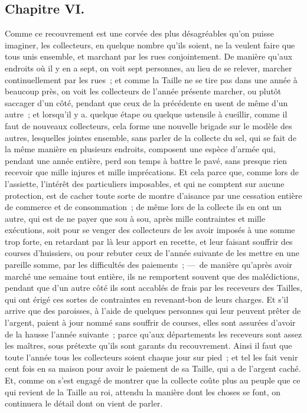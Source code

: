 \documentclass[french,twoside]{book} %
\begin{document}
\subsection[{Chapitre VI.}]{Chapitre VI.}
\noindent Comme ce recouvrement est une corvée des plus désagréables qu’on puisse imaginer, les collecteurs, en quelque nombre qu’ils soient, ne la veulent faire que tous unis ensemble, et marchant par les rues conjointement. De manière qu’aux endroits où il y en a sept, on voit sept personnes, au lieu de se relever, marcher continuellement par les rues ; et comme la Taille ne se tire pas dans une année à beaucoup près, on voit les collecteurs de l’année présente marcher, ou plutôt saccager d’un côté, pendant que ceux de la précédente en usent de même d’un autre ; et lorsqu’il y a. quelque étape ou quelque ustensile à cueillir, comme il faut de nouveaux collecteurs, cela forme une nouvelle brigade sur le modèle des autres, lesquelles jointes ensemble, sans parler de la collecte du sel, qui se fait de la même manière en plusieurs endroits, composent une espèce d’armée qui, pendant une année entière, perd son temps à battre le pavé, sans presque rien recevoir que mille injures et mille imprécations. Et cela parce que, comme lors de l’assiette, l’intérêt des particuliers imposables, et qui ne comptent sur aucune protection, est de cacher toute sorte de montre d’aisance par une cessation entière de commerce et de consommation ; de même lors de la collecte ils en ont un autre, qui est de ne payer que sou à sou, après mille contraintes et mille exécutions, soit pour se venger des collecteurs de les avoir imposés à une somme trop forte, en retardant par là leur apport en recette, et leur faisant souffrir des courses d’huissiers, ou pour rebuter ceux de l’année suivante de les mettre en une pareille somme, par les difficultés des paiements ; — de manière qu’après avoir marché une semaine tout entière, ils ne remportent souvent que des malédictions, pendant que d’un autre côté ils sont accablés de frais par les receveurs des Tailles, qui ont érigé ces sortes de contraintes en revenant-bon de leurs charges. Et s’il arrive que des paroisses, à l’aide de quelques personnes qui leur peuvent prêter de l’argent, paient à jour nommé sans souffrir de courses, elles sont assurées d’avoir de la hausse l’année suivante ; parce qu’aux départements les receveurs sont assez les maîtres, sous prétexte qu’ils sont garants du recouvrement. Ainsi il faut que toute l’année tous les collecteurs soient chaque jour sur pied ; et tel les fait venir cent fois en sa maison pour avoir le paiement de sa Taille, qui a de l’argent caché. Et, comme on s’est engagé de montrer que la collecte coûte plus au peuple que ce qui revient de la Taille au roi, attendu la manière dont les choses se font, on continuera le détail dont on vient de parler.\par
\end{document}

